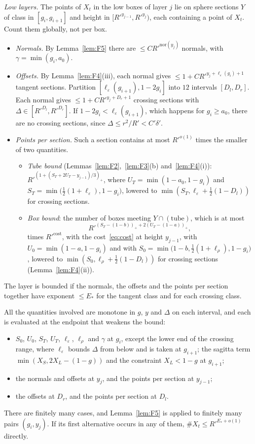 \documentclass[aps,prx,twocolumn,superscriptaddress,nofootinbib,longbibliography]{revtex4-2}
\theoremstyle{plain}
\theoremstyle{definition}
\theoremstyle{remark}
\begin{document}
\emph{Low layers.} The points of $X_t$ in the low boxes of layer $j$ lie on sphere sections $Y$ of class in $[g_i,g_{i+1}]$ and height in $[R'^{y_{j-1}},R'^{y_j})$, each containing a point of $X_t$. Count them globally, not per box.
\begin{itemize}\setlength\itemsep{0pt}
\item \emph{Normals.} By Lemma~\ref{lem:F5} there are $\le CR'^{\mathrm{nor}(y_j)}$ normals, with $\gamma=\min(g_i,a_0)$.
\item \emph{Offsets.} By Lemma~\ref{lem:F4}(iii), each normal gives $\le1+CR'^{y_j+\ell_\varepsilon(g_i)+1}$ tangent sections. Partition $[\ell_\varepsilon(g_{i+1}),1-2g_i]$ into $12$ intervals $[D_l,D_r]$. Each normal gives $\le1+CR'^{y_j+D_r+1}$ crossing sections with $\Delta\in[R'^{D_l},R'^{D_r}]$. If $1-2g_i<\ell_\varepsilon(g_{i+1})$, which happens for $g_i\ge a_0$, there are no crossing sections, since $\Delta\le r^2/R'<C'\delta'$.
\item \emph{Points per section.} Such a section contains at most $R'^{o(1)}$ times the smaller of two quantities.
\begin{itemize}\setlength\itemsep{0pt}
\item \emph{Tube bound} (Lemmas~\ref{lem:F2},~\ref{lem:F3}(b) and~\ref{lem:F4}(i)): $R'^{(1+(S_T+2U_T-y_{j-1})/3)_+}$, where $U_T=\min(1-a_0,1-g_i)$ and $S_T=\min\big(\tfrac12(1+\ell_\varepsilon),1-g_i\big)$, lowered to $\min(S_T,\ell_\varepsilon+\tfrac12(1-D_l))$ for crossing sections.
\item \emph{Box bound}: the number of boxes meeting $Y\cap(\text{tube})$, which is at most
\[R'^{(S_T-(1-b))_++2(U_T-(1-a))_+},\]
times $R'^{\mathrm{cost}}$, with the cost~\eqref{eq:cost} at height $y_{j-1}$, with $U_0=\min(1-a,1-g_i)$ and with $S_0=\min\big(1-b,\tfrac12(1+\ell_\rho),1-g_i\big)$, lowered to $\min(S_0,\ell_\rho+\tfrac12(1-D_l))$ for crossing sections (Lemma~\ref{lem:F4}(ii)).
\end{itemize}
\end{itemize}
The layer is bounded if the normals, the offsets and the points per section together have exponent $\le E_*$ for the tangent class and for each crossing class.

All the quantities involved are monotone in $g$, $y$ and $\Delta$ on each interval, and each is evaluated at the endpoint that weakens the bound:
\begin{itemize}\setlength\itemsep{0pt}
\item $S_0$, $U_0$, $S_T$, $U_T$, $\ell_\varepsilon$, $\ell_\rho$ and $\gamma$ at $g_i$, except the lower end of the crossing range, where $\ell_\varepsilon$ bounds $\Delta$ from below and is taken at $g_{i+1}$; the sagitta term $\min(X_S,2X_L-(1-g))$ and the constraint $X_L<1-g$ at $g_{i+1}$;
\item the normals and offsets at $y_j$, and the points per section at $y_{j-1}$;
\item the offsets at $D_r$, and the points per section at $D_l$.
\end{itemize}
There are finitely many cases, and Lemma~\ref{lem:F5} is applied to finitely many pairs $(g_i,y_j)$. If its first alternative occurs in any of them, $\#X_t\le R'^{E_*+o(1)}$ directly.
\end{document}

